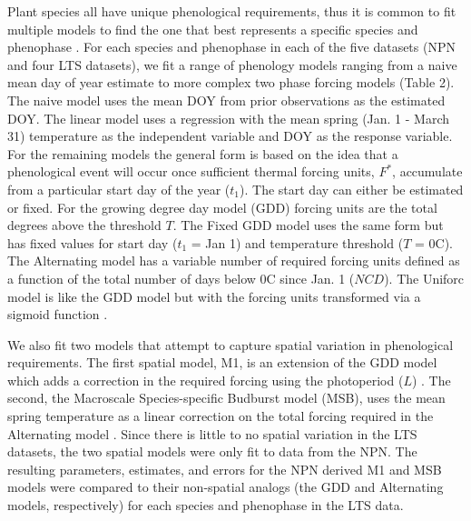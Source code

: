 \documentclass[fleqn,10pt,lineno]{wlpeerj} %
\begin{document}
Plant species all have unique phenological requirements, thus it is common to fit multiple models to find the one that best represents a specific species and phenophase \citep{chuine2013}. For each species and phenophase in each of the five datasets (NPN and four LTS datasets), we fit a range of phenology models ranging from a naive mean day of year estimate to more complex two phase forcing models (Table 2). The naive model uses the mean DOY from prior observations as the estimated DOY. The linear model uses a regression with the mean spring (Jan. 1 - March 31) temperature as the independent variable and DOY as the response variable. For the remaining models the general form is based on the idea that a phenological event will occur once sufficient thermal forcing units, $F^{*}$, accumulate from a particular start day of the year ($t_{1}$). The start day can either be estimated or fixed. For the growing degree day model (GDD) forcing units are the total degrees above the threshold $T$. The Fixed GDD model uses the same form but has fixed values for start day ($t_{1}$ = Jan 1) and temperature threshold ($T$ = 0C). The Alternating model has a variable number of required forcing units defined as a function of the total number of days below 0C since Jan. 1 ($NCD$). The Uniforc model is like the GDD model but with the forcing units transformed via a sigmoid function \citep{chuine2000}.

We also fit two models that attempt to capture spatial variation in phenological requirements. The first spatial model, M1, is an extension of the GDD model which adds a correction in the required forcing using the photoperiod ($L$) \citep{blumel2012}. The second, the Macroscale Species-specific Budburst model (MSB), uses the mean spring temperature as a linear correction on the total forcing required in the Alternating model \citep{jeong2013}. Since there is little to no spatial variation in the LTS datasets, the two spatial models were only fit to data from the NPN. The resulting parameters, estimates, and errors for the NPN derived M1 and MSB models were compared to their non-spatial analogs (the GDD and Alternating models, respectively) for each species and phenophase in the LTS data.  
\end{document}
